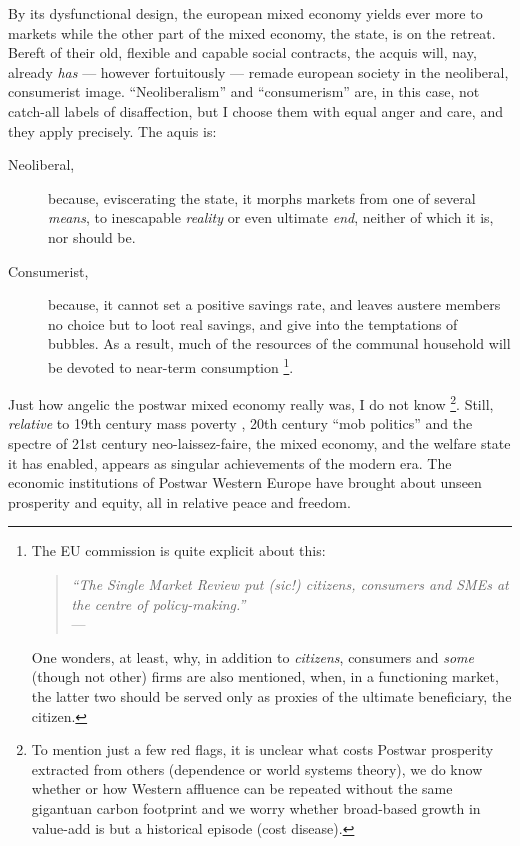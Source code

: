 \documentclass[11pt,a4paper,oneside,openright]{article}
\begin{document}
By its dysfunctional design, the european mixed economy yields ever more to markets while the other part of the mixed economy, the state, is on the retreat. 
Bereft of their old, flexible and capable social contracts, the acquis will, nay, already \emph{has} --- however fortuitously --- remade european society in the neoliberal, consumerist image. 
``Neoliberalism'' and ``consumerism'' are, in this case, not catch-all labels of disaffection, but I choose them with equal anger and care, and they apply precisely. 
The aquis is:
\begin{description}
	\item[Neoliberal,] because, eviscerating the state, it morphs markets from one of several \emph{means}, to inescapable \emph{reality} or even ultimate \emph{end}, neither of which it is, nor should be.
	\item[Consumerist,] because, it cannot set a positive savings rate, and leaves austere members no choice but to loot real savings, and give into the temptations of bubbles. 
	As a result, much of the resources of the communal household will be devoted to near-term consumption
	\footnote{
		The \gls{EU} commission is quite explicit about this:
			\begin{quote}
				\emph{``The Single Market Review put \emph{(sic!)} citizens, consumers and \glspl{SME} at the centre of policy-making.''}\\
				--- \cite[3]{Commission2008}	 
			\end{quote} 
		One wonders, at least, why, in addition to \emph{citizens}, consumers and \emph{some} (though not other) firms are also mentioned, when, in a functioning market, the latter two should be served only as proxies of the ultimate beneficiary, the citizen.
	}.
	
\end{description}

Just how angelic the postwar mixed economy really was, I do not know
\footnote{
	To mention just a few red flags, it is unclear what costs Postwar prosperity extracted from others (dependence or world systems theory), we do know whether or how Western affluence can be repeated without the same gigantuan carbon footprint and we worry whether broad-based growth in value-add is but a historical episode (cost disease).
}. 
Still, \emph{relative} to 19th century mass poverty \citep{MarxEngels-1848-aa}, 20th century ``mob politics'' \citep[158]{Crouch2004} and the spectre of 21st century neo-laissez-faire, the mixed economy, and the welfare state it has enabled, appears as singular achievements of the modern era. 
The economic institutions of Postwar Western Europe have brought about unseen prosperity and equity, all in relative peace and freedom. 
\end{document}
